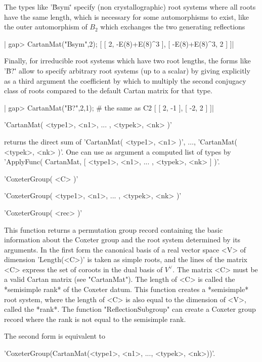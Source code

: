 The types like '\"Bsym\"' specify (non crystallographic) root systems where
all  roots have the same length,  which is necessary for some automorphisms
to  exist, like  the outer  automorphism of  $B_2$ which  exchanges the two
generating reflections\:

|    gap> CartanMat("Bsym",2);
    [ [ 2, -E(8)+E(8)^3 ], [ -E(8)+E(8)^3, 2 ] ]|

Finally, for irreducible  root systems which have two  root lengths, the
forms like  '\"B?\"' allow to  specify arbitrary  root systems (up  to a
scalar) by  giving explicitly  as a third  argument the  coefficient by
which to  multiply the second conjugacy  class of roots compared  to the
default Cartan matrix for that type.

|    gap> CartanMat("B?",2,1); # the same as C2
    [ [ 2, -1 ], [ -2, 2 ] ]|


'CartanMat( <type1>, <n1>, ... , <typek>, <nk> )'

returns  the  direct sum  of  'CartanMat(  <type1>, <n1>  )',  $\ldots$,
'CartanMat( <typek>, <nk> )'. One can use as argument a computed list of
types by 'ApplyFunc(  CartanMat, [ <type1>, <n1>, ... ,  <typek>, <nk> ]
)'.


'CoxeterGroup( <C> )'

'CoxeterGroup( <type1>, <n1>, ... , <typek>, <nk> )'

'CoxeterGroup( <rec> )'

This  function  returns  a  permutation  group  record containing the basic
information  about the Coxeter group and  the root system determined by its
arguments. In the first form the canonical basis of a real vector space <V>
of  dimension 'Length(<C>)' is taken as simple  roots, and the lines of the
matrix  <C> express the set  of coroots in the  dual basis of $V^\vee$. The
matrix  <C> must be a valid Cartan  matrix (see "CartanMat"). The length of
<C>  is called  the *semisimple  rank* of  the Coxeter datum. This function
creates  a *semisimple* root system, where the  length of <C> is also equal
to the dimension of <V>, called the *rank*. The function
"ReflectionSubgroup"  can create a  Coxeter group record  where the rank is
not equal to the semisimple rank.

The  second form  is  equivalent to

'CoxeterGroup(CartanMat(<type1>, <n1>, ..., <typek>, <nk>))'.

